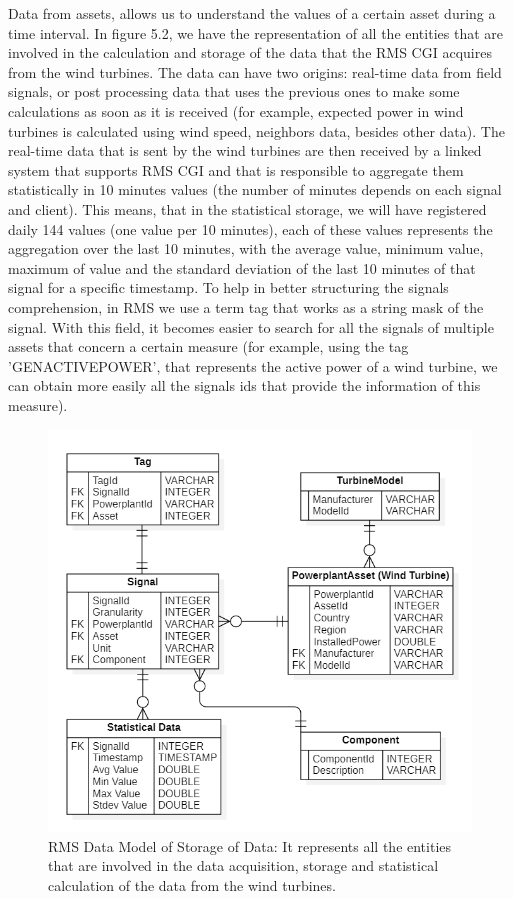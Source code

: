 Data from assets, allows us to understand the values of a certain asset during a time interval. In figure 5.2, we have the representation of all the entities that are involved in the calculation and storage of the data that the RMS CGI acquires from the wind turbines.
The data can have two origins: real-time data from field signals, or post processing data that uses the previous ones to make some calculations as soon as it is received (for example, expected power in wind turbines is calculated using wind speed, neighbors data, besides other data).
The real-time data that is sent by the wind turbines are then received by a linked system that supports RMS CGI and that is responsible to aggregate them statistically in 10 minutes values (the number of minutes depends on each signal and client). This means, that in the statistical storage, we will have registered daily 144 values (one value per 10 minutes), each of these values represents the aggregation over the last 10 minutes, with the average value, minimum value, maximum of value and the standard deviation of the last 10 minutes of that signal for a specific timestamp.
To help in better structuring the signals comprehension, in RMS we use a term  tag that works as a string mask of the signal. With this field, it becomes easier to search for all the signals of multiple assets that concern a certain measure (for example, using the tag 'GENACTIVEPOWER', that represents the active power of a wind turbine, we can obtain more easily all the signals ids that provide the information of this measure).

\begin{figure}[htbp]
	\centering
	\includegraphics[scale=0.7]{Chapters/Figures/methodology_fig11.png}
	\caption{RMS Data Model of Storage of Data: It represents all the entities that are involved in the data acquisition, storage and statistical calculation of the data from the wind turbines.}
	\label{fig:Figuras_Tree_silhouettes-vectorial}
\end{figure}


